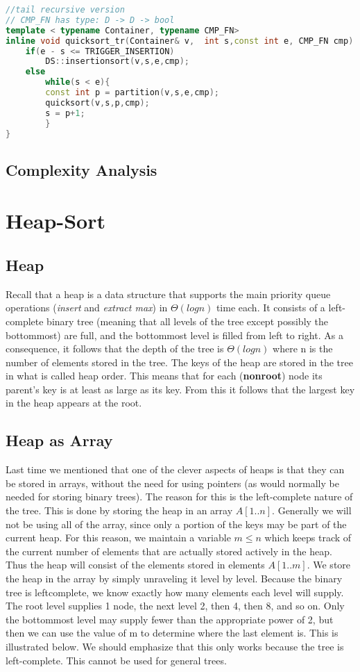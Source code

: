 \begin{lstlisting}[language=c++, caption="QuickSort Tail Recursive"]
//tail recursive version
// CMP_FN has type: D -> D -> bool
template < typename Container, typename CMP_FN>
inline void quicksort_tr(Container& v,  int s,const int e, CMP_FN cmp) {
    if(e - s <= TRIGGER_INSERTION)
        DS::insertionsort(v,s,e,cmp);
    else
        while(s < e){
        const int p = partition(v,s,e,cmp);
        quicksort(v,s,p,cmp);
        s = p+1;
        }
}
\end{lstlisting}


\subsection{Complexity Analysis}

\section{Heap-Sort}
\subsection{Heap}
Recall that a heap is a data structure that supports the main priority queue operations (\textit{insert} and \textit{extract max}) in $\mathcal{\Theta}(log n)$ time each. It consists of a left-complete binary tree (meaning that all levels of the tree except possibly the bottommost) are full, and the bottommost level is filled from left to right. As a consequence, it follows that the depth of the tree is $\mathcal{\Theta}(log n)$ where n is the number of elements stored in the tree. The keys of the heap are stored in the tree in what is called heap order. This means that for each (\textbf{nonroot}) node its parent’s key is at least as large as its key. From this it follows that the largest key in the heap appears at the root.
\subsection{Heap as Array}
Last time we mentioned that one of the clever aspects of heaps is that they can be stored in
arrays, without the need for using pointers (as would normally be needed for storing binary trees). The
reason for this is the left-complete nature of the tree.
This is done by storing the heap in an array $A[1..n]$. Generally we will not be using all of the array,
since only a portion of the keys may be part of the current heap. For this reason, we maintain a variable
$m \leq n$ which keeps track of the current number of elements that are actually stored actively in the
heap. Thus the heap will consist of the elements stored in elements $A[1..m]$.
We store the heap in the array by simply unraveling it level by level. Because the binary tree is leftcomplete, we know exactly how many elements each level will supply. The root level supplies 1 node,
the next level 2, then 4, then 8, and so on. Only the bottommost level may supply fewer than the
appropriate power of 2, but then we can use the value of m to determine where the last element is. This
is illustrated below. We should emphasize that this only works because the tree is left-complete. This cannot be used for
general trees.

